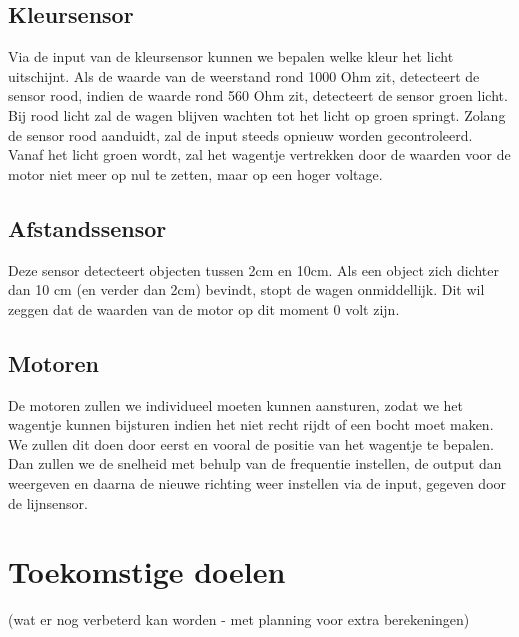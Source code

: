 \documentclass[twoside,kulak]{kulakreport} %
\begin{document}
		\subsection{Kleursensor}
		Via de input van de kleursensor kunnen we bepalen welke kleur het licht uitschijnt. Als de waarde van de weerstand rond 1000 Ohm zit, detecteert de sensor rood, indien de waarde rond 560 Ohm zit, detecteert de sensor groen licht. Bij rood licht zal de wagen blijven wachten tot het licht op groen springt. Zolang de sensor rood aanduidt, zal de input steeds opnieuw worden gecontroleerd. Vanaf het licht groen wordt, zal het wagentje vertrekken door de waarden voor de motor niet meer op nul te zetten, maar op een hoger voltage.
		
		
		\subsection{Afstandssensor}
		Deze sensor detecteert objecten tussen 2cm en 10cm. Als een object zich dichter dan 10 cm (en verder dan 2cm) bevindt, stopt de wagen onmiddellijk. Dit wil zeggen dat de waarden van de motor op dit moment 0 volt zijn.
		
		\subsection{Motoren}
		De motoren zullen we individueel moeten kunnen aansturen, zodat we het wagentje  kunnen bijsturen indien het niet recht rijdt of een bocht moet maken. We zullen dit doen door eerst en vooral de positie van het wagentje te bepalen. Dan zullen we de snelheid met behulp van de frequentie instellen, de output dan weergeven en daarna de nieuwe richting weer instellen via de input, gegeven door de lijnsensor. 

		
	
	\section{Toekomstige doelen}
	(wat er nog verbeterd kan worden - met planning voor extra berekeningen)
\end{document}
